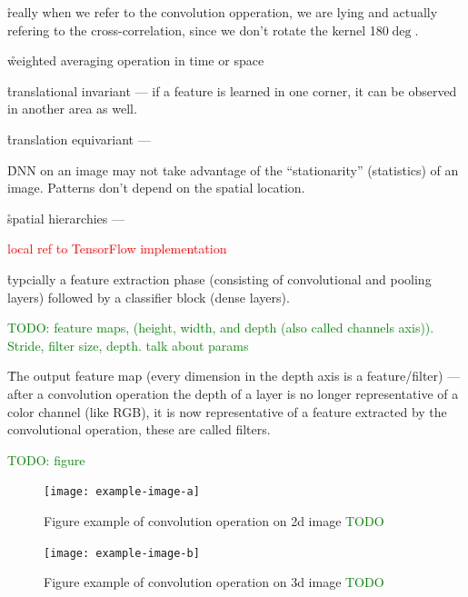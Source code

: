 

\r{really when we refer to the convolution opperation, we are lying and actually refering to the cross-correlation, since we don't rotate the kernel 180$\deg$.}


\r{weighted averaging operation in time or space}

\r{translational invariant --- if a feature is learned in one corner, it can be observed in another area as well.}

\r{translation equivariant --- }

\r{DNN on an image may not take advantage of the ``stationarity'' (statistics) of an image. Patterns don't depend on the spatial location.}

\r{spatial hierarchies --- }

\textcolor{red}{local ref to TensorFlow implementation}

\r{typcially a feature extraction phase (consisting of convolutional and pooling layers) followed by a classifier block (dense layers).}

\textcolor{green}{TODO: feature maps, (height, width, and depth (also called channels axis)). Stride, filter size, depth. talk about params}

\r{The output feature map (every dimension in the depth axis is a feature/filter) --- after a convolution operation the depth of a layer is no longer representative of a color channel (like RGB), it is now representative of a feature extracted by the convolutional operation, these are called filters.}





\textcolor{green}{TODO: figure}

\begin{figure}[htp]
	\centering
	\texttt{[image: example-image-a]}\hfil
	\caption{Figure example of convolution operation on 2d image \textcolor{green}{TODO}}
	\label{fig:conv_2d_example_calc}
\end{figure}

\begin{figure}[htp]
	\centering
	\texttt{[image: example-image-b]}\hfil
	\caption{Figure example of convolution operation on 3d image \textcolor{green}{TODO}}
	\label{fig:conv_2d_depth_example_calc}
\end{figure}

